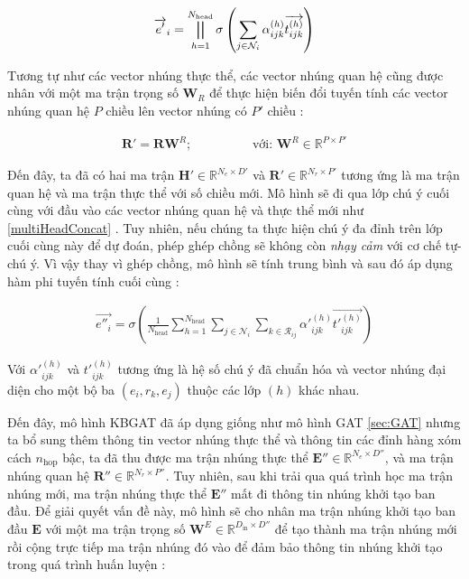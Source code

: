 \begin{align}
\overrightarrow{e'}_i=\bigparallel_{h=1}^{N_{\text{head}}} \sigma\left(\sum_{j\in \mathcal{N}_i}\alpha_{ijk}^{(h)} \overrightarrow{t^{(h)}_{ijk}}\right)
\end{align}

Tương tự như các vector nhúng thực thể, các vector nhúng quan hệ cũng được nhân với một ma trận trọng số $\mathbf{W}_R$ để thực hiện biến đổi tuyến tính các vector nhúng quan hệ $P$ chiều lên vector nhúng có $P'$ chiều :

\begin{align}
\mathbf{R'} = \mathbf{R} \mathbf{W}^R; \hspace{2cm} \text{với: } \mathbf{W}^R \in \mathbb{R}^{P \times P'}
\end{align}

Đến đây, ta đã có hai ma trận $\mathbf{H}' \in \mathbb{R}^{N_e \times D'}$ và $\mathbf{R}' \in \mathbb{R}^{N_r \times P'}$ tương ứng là ma trận quan hệ và ma trận thực thể với số chiều mới. Mô hình sẽ đi qua lớp chú ý cuối cùng với đầu vào các vector nhúng quan hệ và thực thể mới như \ref{multiHeadConcat} . Tuy nhiên, nếu chúng ta thực hiện chú ý đa đỉnh trên lớp cuối cùng này để dự đoán, phép ghép chồng sẽ không còn \textit{nhạy cảm} với cơ chế tự-chú ý. Vì vậy thay vì ghép chồng, mô hình sẽ tính trung bình và sau đó áp dụng hàm phi tuyến tính cuối cùng :

\begin{align}
\label{eq:multiHeadRelationAttention}
\overrightarrow{e''_{i}}=\sigma\left(\frac{1}{N_{\text{head}}} \sum_{h=1}^{N_{\text{head}}} \sum_{j \in \mathcal{N}_i} \sum_{k \in \mathcal{R}_{ij}} \alpha'^{(h)}_{ijk} \overrightarrow{t'^{(h)}_{ijk}} \right)
\end{align}

Với $\alpha'^{(h)}_{ijk}$ và $t'^{(h)}_{ijk}$ tương ứng là hệ số chú ý đã chuẩn hóa và vector nhúng đại diện cho một bộ ba $(e_i, r_k, e_j)$ thuộc các lớp $(h)$ khác nhau.


Đến đây, mô hình KBGAT đã áp dụng giống như mô hình GAT \ref{sec:GAT} nhưng ta bổ sung thêm thông tin vector nhúng thực thể và thông tin các đỉnh hàng xóm cách $n_{\text{hop}}$ bậc, ta đã thu được ma trận nhúng thực thể $\mathbf{E}'' \in \mathbb{R}^{N_e \times D''}$, và ma trận nhúng quan hệ $\mathbf{R}'' \in \mathbb{R}^{N_r \times P''}$. Tuy nhiên, sau khi trải qua quá trình học ma trận nhúng mới, ma trận nhúng thực thể $\mathbf{E}''$ mất đi thông tin nhúng khởi tạo ban đầu. Để giải quyết vấn đề này, mô hình sẽ cho nhân ma trận nhúng khởi tạo ban đầu $\mathbf{E}$ với một ma trận trọng số $\mathbf{W}^E \in \mathbb{R}^{D_{\text{in}} \times D''}$ để tạo thành ma trận nhúng mới rồi cộng trực tiếp ma trận nhúng đó vào để đảm bảo thông tin nhúng khởi tạo trong quá trình huấn luyện :

